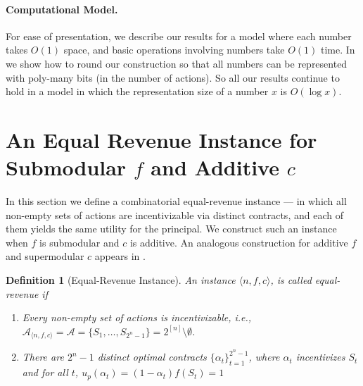 \documentclass[11pt]{article}
\newtheorem{definition}{Definition}
\newcommand{\IS}{\mathcal{A}}
\newcommand{\instance}{\langle n, f, c \rangle}
\begin{document}
\paragraph{Computational Model.} For ease of presentation, we describe our results for a model where each number takes $O(1)$ space, and basic operations involving numbers take $O(1)$ time.
In  we show how to round our construction so that all numbers can be represented with poly-many bits (in the number of actions). So all our results continue to hold in a model in which the representation size of a number $x$ is $O(\log x)$.

\section{An Equal Revenue Instance for Submodular $f$ and Additive $c$}\label{sec:eqRev}
In this section we define a combinatorial equal-revenue instance --- in which all non-empty sets of actions are incentivizable via distinct contracts, and each of them yields the same utility for the principal. 
We construct such an instance when $f$ is submodular and $c$ is additive. An analogous construction for additive $f$ and supermodular $c$ appears in . 

\begin{definition}[Equal-Revenue Instance]\label{def:eqRev}
An instance $\instance$, is called \emph{equal-revenue} if 
\begin{enumerate}
    \setlength\itemsep{-0.25em}
    \item Every non-empty set of actions is incentivizable, i.e., $\IS_{\instance} = \IS = \{S_1, \dots, S_{2^n-1}\} =  2^{[n]} \setminus \emptyset$. 
    \item There are $2^n-1$ distinct optimal contracts $\{\alpha_{t}\}_{t=1}^{2^n-1}$, where $\alpha_t$ incentivizes $S_t$ and for all $t$, $u_p(\alpha_t) = (1-\alpha_t)f(S_t) = 1$
\end{enumerate}
\end{definition}
\end{document}
